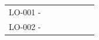 \begin{landscape}
\begin{table}[]
{\begin{tabular}{lllllll}
LO-001 -                                                                    &                                                                                                                                                                                                                                                                &                                                                                                                                                                                                                                                                &                         &                                                                                                                                                                  &                                                                                                                                                 &                                                                                                                                        \\
LO-002 -                                                                    &                                                                                                                                                                                                                                                                &                                                                                                                                                                                                                                                                &                         &                                                                                                                                                                  &                                                                                                                                                 &                                                                                                                                        \\

\end{tabular}}
\end{table}
\end{landscape}

